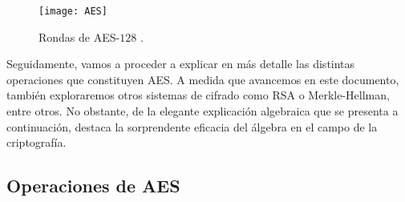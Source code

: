     \begin{figure}[H]
        \centering
        \texttt{[image: AES]}
        \caption{Rondas de AES-$128$ \cite{cryptoSchool}.}
        \label{fig:1.1}
    \end{figure}
    
    Seguidamente, vamos a proceder a explicar en más detalle las distintas operaciones que constituyen AES. A medida que avancemos en este documento, también exploraremos otros sistemas de cifrado como RSA o Merkle-Hellman, entre otros. No obstante, de la elegante explicación algebraica que se presenta a continuación, destaca la sorprendente eficacia del álgebra en el campo de la criptografía.

    \subsection{Operaciones de AES}

